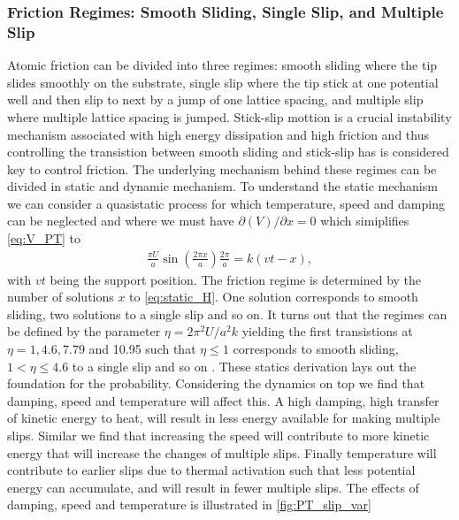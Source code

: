 \subsubsection{Friction Regimes: Smooth Sliding, Single Slip, and Multiple Slip}
Atomic friction can be divided into three regimes: smooth sliding where the tip slides smoothly on the substrate, single slip where the tip stick at one potential well and then slip to next by a jump of one lattice spacing, and multiple slip where multiple lattice spacing is jumped. Stick-slip mottion is a crucial instability mechanism associated with high energy dissipation and high friction and thus controlling the transistion between smooth sliding and stick-slip has is considered key to control friction. The underlying mechanism behind these regimes can be divided in static and dynamic mechanism. To understand the static mechanism we can consider a quasistatic process for which temperature, speed and damping can be neglected and where we must have $\partial(V)/\partial x = 0$ which simiplifies \cref{eq:V_PT} to 
\begin{align}
  \frac{\pi U}{a} \sin\left(\frac{2\pi x}{a}\right) \frac{2 \pi}{a} = k(vt - x),
  \label{eq:static_H}
\end{align}
with $vt$ being the support position. The friction regime is determined by the
number of solutions $x$ to \cref{eq:static_H}. One solution corresponds to
smooth sliding, two solutions to a single slip and so on. It turns out that the
regimes can be defined by the parameter $\eta = 2\pi^2U/a^2k$ yielding the first
transistions at $\eta = 1, 4.6, 7.79$ and 10.95 such that $\eta \le 1$
corresponds to smooth sliding, $1<\eta \le 4.6$ to a single slip and so on
\cite{Johnson_1998, Medyanik_2006}. These statics derivation lays out the
foundation for the probability. Considering the dynamics on top we find that
damping, speed and temperature will affect this. A high damping, high transfer
of kinetic energy to heat, will result in less energy available for making
multiple slips. Similar we find that increasing the speed will contribute to
more kinetic energy that will increase the changes of multiple slips. Finally
temperature will contribute to earlier slips due to thermal activation such that
less potential energy can accumulate, and will result in fewer multiple slips. The effects of damping, speed and temperature is illustrated in \cref{fig:PT_slip_var}



